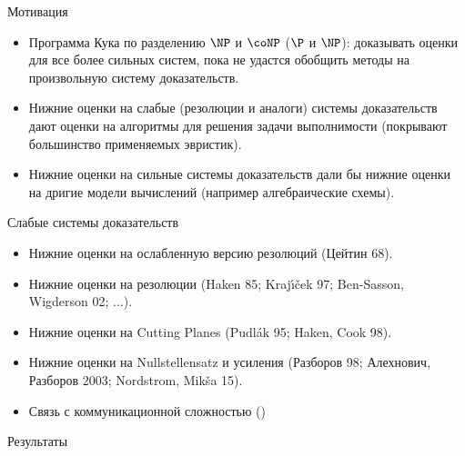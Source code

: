 \begin{frame}{Мотивация}

    \begin{itemize}
        \item Программа Кука по разделению $\NP$ и $\coNP$ ($\P$ и $\NP$): доказывать оценки для {\color{blue} все более
            сильных} систем, пока не удастся обобщить методы на произвольную систему доказательств.
        \pause
        \item Нижние оценки на {\color{blue} слабые} (резолюции и аналоги) системы доказательств дают оценки на алгоритмы для
            решения задачи выполнимости (покрывают большинство применяемых эвристик).
        \pause
        \item Нижние оценки на {\color{blue} сильные} системы доказательств дали бы нижние оценки на дригие модели вычислений
            (например алгебраические схемы).
    \end{itemize}
\end{frame}


\begin{frame}{\alert{Слабые} системы доказательств}

    \begin{itemize}
        \item Нижние оценки на ослабленную версию резолюций (Цейтин 68).
        \pause
        \item Нижние оценки на резолюции (Haken 85; Kraj{\'{\i}}{\v{c}}ek 97; Ben-Sasson, Wigderson 02; ...).
        \pause
        \item Нижние оценки на Cutting Planes (Pudl{\'{a}}k 95; Haken, Cook 98).
        \pause
        \item Нижние оценки на Nullstellensatz и усиления (Разборов 98; Алехнович, Разборов 2003; Nordstrom, Mik{\v{s}}a 15).
        \pause
        \item Связь с коммуникационной сложностью ()    
    \end{itemize}

\end{frame}

\begin{frame}{Результаты}


\end{frame}

